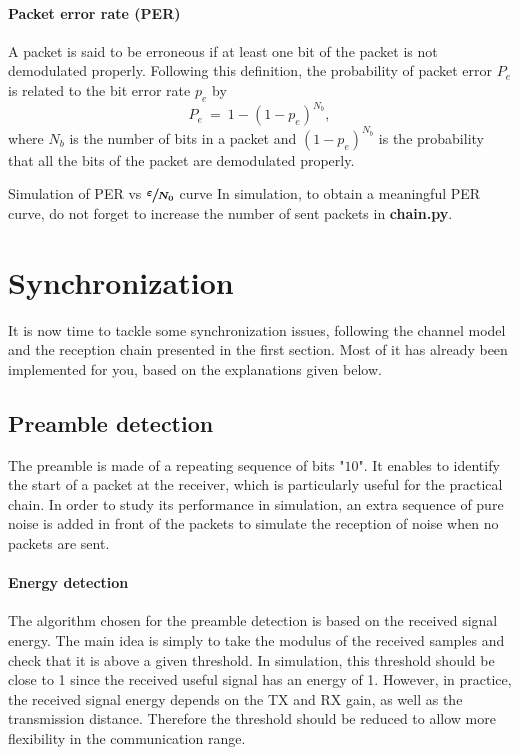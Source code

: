 \paragraph{Packet error rate (PER)} A packet is said to be erroneous if at least one bit of the packet is not demodulated properly. Following this definition, the probability of packet error $P_e$ is related to the bit error rate $p_e$ by
\begin{equation*}
    P_e\:=\:1- (1-p_e)^{N_b},
\end{equation*}
where $N_b$ is the number of bits in a packet and $(1-p_e)^{N_b}$ is the probability that all the bits of the packet are demodulated properly.
\begin{bclogo}[couleur = gray!20, arrondi = 0.2, logo=\bccrayon]{Simulation of PER vs $\boldsymbol{\sfrac{\varepsilon}{N_0}}$ curve}
In simulation, to obtain a meaningful PER curve, do not forget to increase the number of sent packets in \textbf{chain.py}.
\end{bclogo}



\section{Synchronization}
It is now time to tackle some synchronization issues, following the channel model and the reception chain presented in the first section. Most of it has already been implemented for you, based on the explanations given below.

\subsection{Preamble detection}
The preamble is made of a repeating sequence of bits "$10$". It enables to identify the start of a packet at the receiver, which is particularly useful for the practical chain. In order to study its performance in simulation, an extra sequence of pure noise is added in front of the packets to simulate the reception of noise when no packets are sent.

\paragraph{Energy detection} The algorithm chosen for the preamble detection is based on the received signal energy. The main idea is simply to take the modulus of the received samples and check that it is above a given threshold. In simulation, this threshold should be close to 1 since the received useful signal has an energy of 1. However, in practice, the received signal energy depends on the TX and RX gain, as well as the transmission distance. Therefore the threshold should be reduced to allow more flexibility in the communication range.


